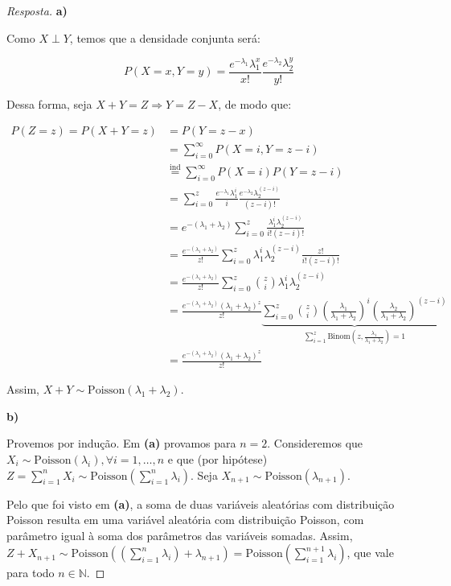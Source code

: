 \documentclass[
]{article}
\theoremstyle{definition}
\theoremstyle{definition}
\theoremstyle{definition}
\theoremstyle{definition}
\theoremstyle{remark}
\begin{document}
\begin{proof}[Resposta]
\textbf{a)}

Como \(X \perp Y\), temos que a densidade conjunta será:

\begin{equation*}
P(X=x,Y=y) = \frac{e^{-\lambda_{1}}\lambda_{1}^{x}}{x!}\frac{e^{-\lambda_{2}}\lambda_{2}^{y}}{y!}
\end{equation*}

Dessa forma, seja \(X+Y = Z \Rightarrow Y = Z-X\), de modo que:

\begin{align*}
P(Z=z) = P(X+Y = z) &= P(Y = z-x) \\
&= \sum_{i=0}^{\infty}P(X = i,Y = z-i) \\
&\stackrel{\text{ind}}{=} \sum_{i=0}^{\infty}P(X = i)P(Y = z-i) \\
&= \sum_{i=0}^{z}\frac{e^{-\lambda_{1}}\lambda_{1}^{i}}{i}\frac{e^{-\lambda_{2}}\lambda_{2}^{(z-i)}}{(z-i)!} \\
&= e^{-(\lambda_{1} + \lambda_{2})}\sum_{i=0}^{z}\frac{\lambda_{1}^{i}\lambda_{2}^{(z-i)}}{i!(z-i)!} \\
&= \frac{e^{-(\lambda_{1} + \lambda_{2})}}{z!}\sum_{i=0}^{z}\lambda_{1}^{i}\lambda_{2}^{(z-i)}\frac{z!}{i!(z-i)!} \\
&= \frac{e^{-(\lambda_{1} + \lambda_{2})}}{z!}\sum_{i=0}^{z}\binom{z}{i}\lambda_{1}^{i}\lambda_{2}^{(z-i)} \\
&= \frac{e^{-(\lambda_{1} + \lambda_{2})}(\lambda_{1} + \lambda_{2})^{z}}{z!}\underbrace{\sum_{i=0}^{z}\binom{z}{i}\left(\frac{\lambda_{1}}{\lambda_{1} + \lambda_{2}}\right)^{i}\left(\frac{\lambda_{2}}{\lambda_{1} + \lambda_{2}}\right)^{(z-i)}}_{\sum_{i=1}^{z}\mathrm{Binom}\left(z,\frac{\lambda_{1}}{\lambda_{1} + \lambda_{2}}\right) = 1} \\
&= \frac{e^{-(\lambda_{1} + \lambda_{2})}(\lambda_{1} + \lambda_{2})^{z}}{z!}
\end{align*}

Assim, \(X + Y \sim \mathrm{Poisson}(\lambda_{1} + \lambda_{2})\).

\textbf{b)}

Provemos por indução. Em \textbf{(a)} provamos para \(n = 2\). Consideremos que \(X_{i} \sim \mathrm{Poisson}(\lambda_{i}), \forall i = 1,\ldots,n\) e que (por hipótese) \(Z = \sum_{i=1}^{n}X_{i} \sim \mathrm{Poisson}\left(\sum_{i=1}^{n}\lambda_{i}\right)\). Seja \(X_{n+1} \sim \mathrm{Poisson}(\lambda_{n+1})\).

Pelo que foi visto em \textbf{(a)}, a soma de duas variáveis aleatórias com distribuição Poisson resulta em uma variável aleatória com distribuição Poisson, com parâmetro igual à soma dos parâmetros das variáveis somadas. Assim, \(Z + X_{n+1} \sim \mathrm{Poisson}\left((\sum_{i=1}^{n}\lambda_{i}) + \lambda_{n+1}\right) = \mathrm{Poisson}\left(\sum_{i=1}^{n+1}\lambda_{i}\right)\), que vale para todo \(n \in \mathbb{N}\).
\end{proof}
\end{document}
